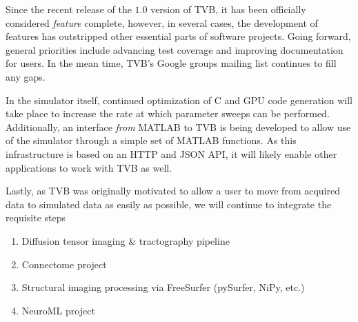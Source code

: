 
Since the recent release of the $1.0$ version of TVB, it has been 
officially considered \textit{feature} complete, however, in several
cases, the development of features has outstripped other essential 
parts of software projects. Going forward, general priorities include
advancing test coverage and improving documentation for users. In the mean
time, TVB's Google groups mailing list continues to fill any gaps. 

In the simulator itself, continued optimization of C and GPU code generation
will take place to increase the rate at which parameter sweeps can be
performed. Additionally, an interface \textit{from} MATLAB to TVB 
is being developed to allow use of the simulator through a simple
set of MATLAB functions. As this infrastructure is based on an HTTP and 
JSON API, it will likely enable other applications to work with TVB as well.

Lastly, as TVB was originally motivated to allow a user to move from
acquired data to simulated data as easily as possible, we will continue
to integrate the requisite steps 

\begin{enumerate}
	\item Diffusion tensor imaging \& tractography pipeline
	\item Connectome project
	\item Structural imaging processing via FreeSurfer (pySurfer, NiPy, etc.)
	\item NeuroML project	
\end{enumerate}


